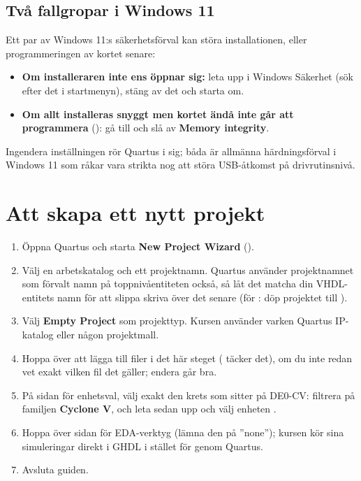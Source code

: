 \subsection{Två fallgropar i Windows 11}
\label{app:quartus:win11}

Ett par av Windows 11:s säkerhetsförval kan störa installationen, eller programmeringen av kortet
senare:

\begin{itemize}
  \item \textbf{Om installeraren inte ens öppnar sig:} leta upp  i Windows
    Säkerhet (sök efter det i startmenyn), stäng av det och starta om.
  \item \textbf{Om allt installeras snyggt men kortet ändå inte går att programmera}
    (): gå till  och slå av \textbf{Memory integrity}.
\end{itemize}


Ingendera inställningen rör Quartus i sig; båda är allmänna härdningsförval i Windows 11 som råkar
vara strikta nog att störa USB-åtkomst på drivrutinsnivå.

\section{Att skapa ett nytt projekt}
\label{app:quartus:project}

\begin{enumerate}
  \item Öppna Quartus och starta \textbf{New Project Wizard} ().
  \item Välj en arbetskatalog och ett projektnamn. Quartus använder projektnamnet som förvalt namn
    på toppnivåentiteten också, så låt det matcha din VHDL-entitets namn för att slippa skriva över
    det senare (för : döp projektet till ).
  \item Välj \textbf{Empty Project} som projekttyp. Kursen använder varken Quartus IP-katalog eller
    någon projektmall.
  \item Hoppa över att lägga till filer i det här steget ( täcker det),
    om du inte redan vet exakt vilken fil det gäller; endera går bra.
  \item På sidan för enhetsval, välj exakt den krets som sitter på DE0-CV: filtrera på familjen
    \textbf{Cyclone V}, och leta sedan upp och välj enheten .
  \item Hoppa över sidan för EDA-verktyg (lämna den på ”none”); kursen kör sina simuleringar direkt i
    GHDL i stället för genom Quartus.
  \item Avsluta guiden.
\end{enumerate}

